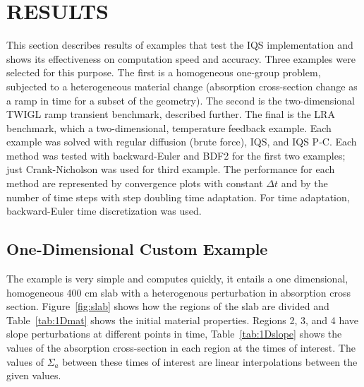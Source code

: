 \documentclass[12pt]{scrartcl}
\newcommand{\fig}[1]{Figure~\ref{#1}}                      %
\newcommand{\tbl}[1]{Table~\ref{#1}}                     %
\begin{document}
\newpage
%
\section{RESULTS} 
\label{sect::results}

This section describes results of examples that test the IQS implementation and shows its effectiveness on computation speed and accuracy.  Three examples were selected for this purpose.  The first is a homogeneous one-group problem, subjected to a heterogeneous material change (absorption cross-section change as a ramp in time for a subset of the geometry).  The second is the two-dimensional TWIGL ramp transient benchmark, described further.  The final is the LRA benchmark, which a two-dimensional, temperature feedback example.  Each example was solved with regular diffusion (brute force), IQS, and IQS P-C.  Each method was tested with backward-Euler and BDF2 for the first two examples; just Crank-Nicholson was used for third example.  The performance for each method are represented by convergence plots with constant $\Delta t$ and by the number of time steps with step doubling time adaptation.  For time adaptation, backward-Euler time discretization was used.

\subsection{One-Dimensional Custom Example}

The example is very simple and computes quickly, it entails a one dimensional, homogeneous 400 cm slab with a heterogenous perturbation in absorption cross section.  \fig{fig:slab} shows how the regions of the slab are divided and \tbl{tab:1Dmat} shows the initial material properties.  Regions 2, 3, and 4 have slope perturbations at different points in time, \tbl{tab:1Dslope} shows the values of the absorption cross-section in each region at the times of interest.  The values of $\Sigma_a$ between these times of interest are linear interpolations between the given values.
\end{document}
